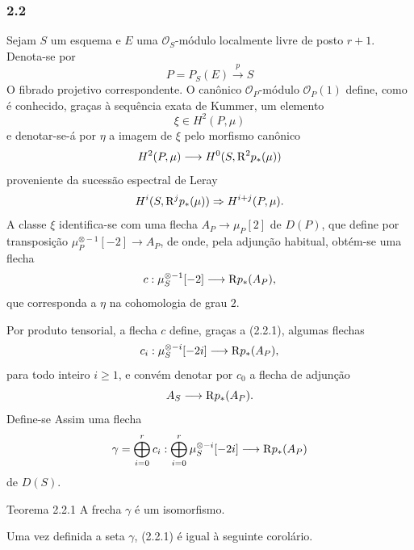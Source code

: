 \subsubsection*{2.2}
Sejam $S$ um esquema e $E$ uma $\mathcal O_S$-módulo localmente livre de posto $r+1$. Denota-se por
\[
P=P_S(E)\xrightarrow{p}S
\]
O fibrado projetivo correspondente. O canônico $\mathcal O_P$-módulo $\mathcal O_P(1)$ define, como é conhecido, graças à sequência exata de Kummer, um elemento
\[
\xi\in H^2(P,\mu)
\]
e denotar-se-á por $\eta$ a imagem de $\xi$ pelo morfismo canônico
\[
H^2(P,\mu)\longrightarrow H^0(S,\mathrm{R}^2p_*(\mu))
\]
proveniente da sucessão espectral de Leray
\[
H^i(S,\mathrm{R}^jp_*(\mu))\Rightarrow H^{i+j}(P,\mu).
\]
A classe $\xi$ identifica-se com uma flecha $A_P\to\mu_P[2]$ de $D(P)$, que define por transposição $\mu_P^{\otimes -1}[-2]\to A_P$, de onde, pela adjunção habitual, obtém-se uma flecha
\[
c:\mu_S^{\otimes -1}[-2]\longrightarrow \mathrm{R} p_*(A_P),
\]
que corresponda a $\eta$ na cohomologia de grau $2$.

Por produto tensorial, a flecha $c$ define, graças a (2.2.1), algumas flechas
\[
c_i:\mu_S^{\otimes -i}[-2i]\longrightarrow \mathrm{R} p_*(A_P),
\]
para todo inteiro $i\ge1$, e convém denotar por $c_0$ a flecha de adjunção
\[
A_S\longrightarrow \mathrm{R} p_*(A_P).
\]
Define-se Assim uma flecha
\[
\gamma=\bigoplus_{i=0}^{r}c_i:
\bigoplus_{i=0}^{r}\mu_S^{\otimes -i}[-2i]\longrightarrow \mathrm{R} p_*(A_P)
\]
de $D(S)$.

\begin{statement}{Teorema 2.2.1}
A frecha $\gamma$ é um isomorfismo.
\end{statement}

Uma vez definida a seta $\gamma$, (2.2.1) é igual à seguinte corolário.
